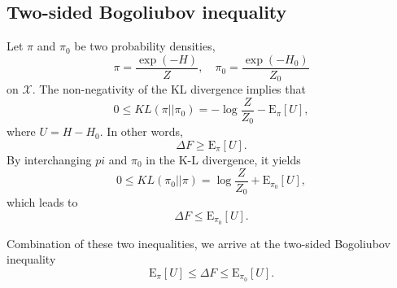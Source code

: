 \begin{appendices}
\chapter{Two-sided Bogoliubov inequality\label{chapter:Appendix:BI}}
Let $\pi$ and $\pi_0$ be two probability densities,
\begin{equation}
	\pi=\frac{\exp(-H)}{Z},\quad  \pi_0=\frac{\exp(-H_0)}{Z_0}
\end{equation}
on $\mathcal{X}$. The non-negativity of the KL divergence implies that
\begin{equation}
	0\leq KL(\pi||\pi_0)=-\log\frac{Z}{Z_0}-\mathrm{E}_{\pi} [U],
\end{equation}
where $U=H-H_0$. In other words,
\begin{equation}
	\Delta F\geq \mathrm{E}_{\pi} [U].
\end{equation}
By interchanging $pi$ and $\pi_0$ in the K-L divergence, it yields
\begin{equation}
	0\leq KL(\pi_0||\pi)=\log\frac{Z}{Z_0}+\mathrm{E}_{\pi_0} [U],
\end{equation}
which leads to
\begin{equation}
	\Delta F\leq \mathrm{E}_{\pi_0} [U].
\end{equation}

Combination of these two inequalities, we arrive at the two-sided Bogoliubov inequality
\begin{equation}
	\mathrm{E}_{\pi} [U] \leq \Delta F\leq \mathrm{E}_{\pi_0} [U].
\end{equation}


\end{appendices}
